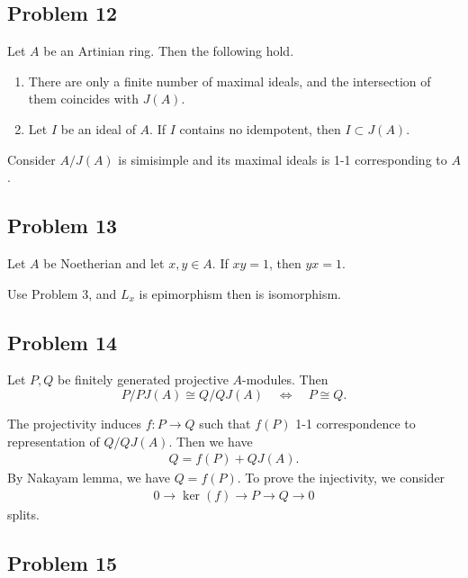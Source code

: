 \subsection{Problem 12}

Let \(A\) be an Artinian ring. Then the following hold.

\begin{enumerate}
    \item[(i)] There are only a finite number of maximal ideals, and the
    intersection of them coincides with \(J(A)\).
    \item[(ii)] Let \(I\) be an ideal of \(A\). If \(I\) contains no idempotent,
    then \(I\subset J(A)\).
\end{enumerate}

\begin{solution}
    Consider $A/J(A)$ is simisimple and its maximal ideals is 1-1 corresponding to $A$. 
\end{solution}

\subsection{Problem 13}

Let \(A\) be Noetherian and let \(x,y\in A\). If \(xy=1\), then \(yx=1\).
\begin{solution}
    Use Problem 3, and $L_x$ is epimorphism then is isomorphism.
\end{solution}


\subsection{Problem 14}

Let \(P,Q\) be finitely generated projective \(A\)-modules. Then
\[
P/PJ(A)\cong Q/QJ(A)
\quad\Longleftrightarrow\quad
P\cong Q.
\]
\begin{solution}
    The projectivity induces $f:P\to Q$ such that $f(P)$ 1-1 correspondence to representation of $Q/QJ(A)$. Then we have 
    \begin{align*}
        Q = f(P) + QJ(A).
    \end{align*}
    By Nakayam lemma, we have $Q=f(P)$. To prove the injectivity, we consider 
    \begin{align*}
        0\to \ker(f) \to P \to Q \to 0
    \end{align*}
    splits.
\end{solution}


\subsection{Problem 15}

